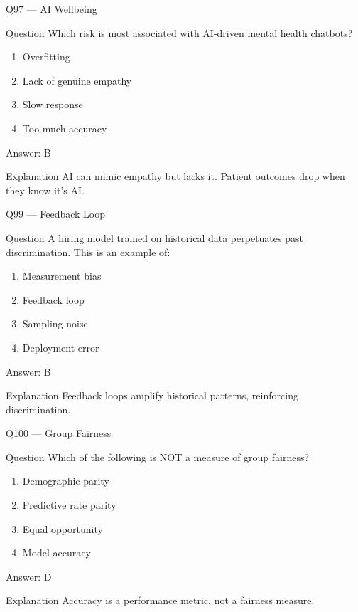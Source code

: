 \documentclass[aspectratio=169,8pt]{beamer}
\begin{document}
	\begin{frame}{Q97 --- AI Wellbeing}
		\begin{block}{Question}
			Which risk is most associated with AI-driven mental health chatbots?
		\end{block}
		\begin{enumerate}
			\item Overfitting
			\item Lack of genuine empathy
			\item Slow response
			\item Too much accuracy
		\end{enumerate}
		\begin{exampleblock}{Answer: B}\end{exampleblock}
		\begin{block}{Explanation}
			AI can mimic empathy but lacks it. Patient outcomes drop when they know it's AI.
		\end{block}
	\end{frame}
	

	
	\begin{frame}{Q99 --- Feedback Loop}
		\begin{block}{Question}
			A hiring model trained on historical data perpetuates past discrimination. This is an example of:
		\end{block}
		\begin{enumerate}
			\item Measurement bias
			\item Feedback loop
			\item Sampling noise
			\item Deployment error
		\end{enumerate}
		\begin{exampleblock}{Answer: B}\end{exampleblock}
		\begin{block}{Explanation}
			Feedback loops amplify historical patterns, reinforcing discrimination.
		\end{block}
	\end{frame}
	
	\begin{frame}{Q100 --- Group Fairness}
		\begin{block}{Question}
			Which of the following is NOT a measure of group fairness?
		\end{block}
		\begin{enumerate}
			\item Demographic parity
			\item Predictive rate parity
			\item Equal opportunity
			\item Model accuracy
		\end{enumerate}
		\begin{exampleblock}{Answer: D}\end{exampleblock}
		\begin{block}{Explanation}
			Accuracy is a performance metric, not a fairness measure.
		\end{block}
	\end{frame}
	
\end{document}
